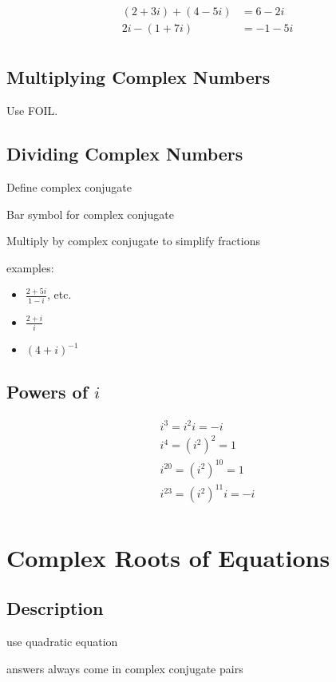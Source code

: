 \documentclass{exam}
\begin{document}
  \begin{align*}
    (2 + 3i) + (4 - 5i) &= 6 - 2i \\
    2i - (1 + 7i) &= -1 - 5i \\
  \end{align*}

  \subsection{Multiplying Complex Numbers}
  Use FOIL.

  \subsection{Dividing Complex Numbers}

  \begin{itemize*}
    \item Define complex conjugate
    \item Bar symbol for complex conjugate
    \item Multiply by complex conjugate to simplify fractions 
  \end{itemize*}

  examples:
  \begin{itemize}
    \item $\frac{2 + 5i}{1 - i}$, etc.
    \item $\frac{2 + i}{i}$
    \item $(4 + i)^{-1}$
  \end{itemize}

  \subsection{Powers of $i$}
  \begin{align*}
    i^3 = i^2 i = -i \\
    i^4 = \left( i^2 \right)^2 = 1 \\
    i^{20} = \left( i^2 \right)^{10} = 1 \\
    i^{23} = \left( i^2 \right)^{11} i = -i \\
  \end{align*}

  \section{Complex Roots of Equations}

  \subsection{Description}
  \begin{itemize*}
    \item use quadratic equation
    \item answers always come in complex conjugate pairs
  \end{itemize*}
\end{document}
